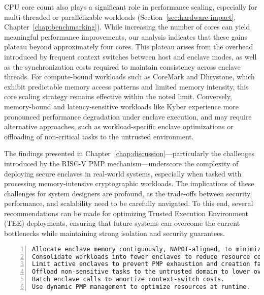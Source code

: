 CPU core count also plays a significant role in performance scaling, especially for multi-threaded or parallelizable workloads (Section~\ref{sec:hardware-impact}, Chapter~\ref{chap:benchmarking}). While increasing the number of cores can yield meaningful performance improvements, our analysis indicates that these gains plateau beyond approximately four cores. This plateau arises from the overhead introduced by frequent context switches between host and enclave modes, as well as the synchronization costs required to maintain consistency across enclave threads. For compute-bound workloads such as CoreMark and Dhrystone, which exhibit predictable memory access patterns and limited memory intensity, this core scaling strategy remains effective within the noted limit. Conversely, memory-bound and latency-sensitive workloads like Kyber experience more pronounced performance degradation under enclave execution, and may require alternative approaches, such as workload-specific enclave optimizations or offloading of non-critical tasks to the untrusted environment.

The findings presented in Chapter~\ref{chap:discussion}—particularly the challenges introduced by the RISC-V PMP mechanism—underscore the complexity of deploying secure enclaves in real-world systems, especially when tasked with processing memory-intensive cryptographic workloads. The implications of these challenges for system designers are profound, as the trade-offs between security, performance, and scalability need to be carefully navigated. To this end, several recommendations can be made for optimizing Trusted Execution Environment (TEE) deployments, ensuring that future systems can overcome the current bottlenecks while maintaining strong isolation and security guarantees.

\begin{lstlisting}[caption={Best Practices for RISC-V TEE Deployment}, 
                   label={lst:enclave-best-practices}, 
                   basicstyle=\ttfamily\small, 
                   numbers=left, 
                   numberstyle=\tiny, 
                   xleftmargin=2em]
Allocate enclave memory contiguously, NAPOT-aligned, to minimize PMP usage.
Consolidate workloads into fewer enclaves to reduce resource contention.
Limit active enclaves to prevent PMP exhaustion and creation failures.
Offload non-sensitive tasks to the untrusted domain to lower overhead.
Batch enclave calls to amortize context-switch costs.
Use dynamic PMP management to optimize resources at runtime.
\end{lstlisting}

